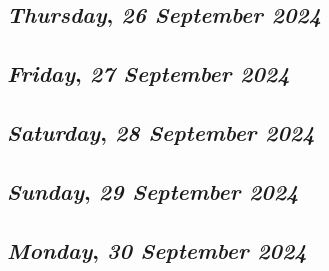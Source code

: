 \def\day{\textit{26 September 2024}}
\def\weekday{\textit{Thursday}}
\subsection*{\weekday, \day}

\def\day{\textit{27 September 2024}}
\def\weekday{\textit{Friday}}
\subsection*{\weekday, \day}

\def\day{\textit{28 September 2024}}
\def\weekday{\textit{Saturday}}
\subsection*{\weekday, \day}

\def\day{\textit{29 September 2024}}
\def\weekday{\textit{Sunday}}
\subsection*{\weekday, \day}

\def\day{\textit{30 September 2024}}
\def\weekday{\textit{Monday}}
\subsection*{\weekday, \day}